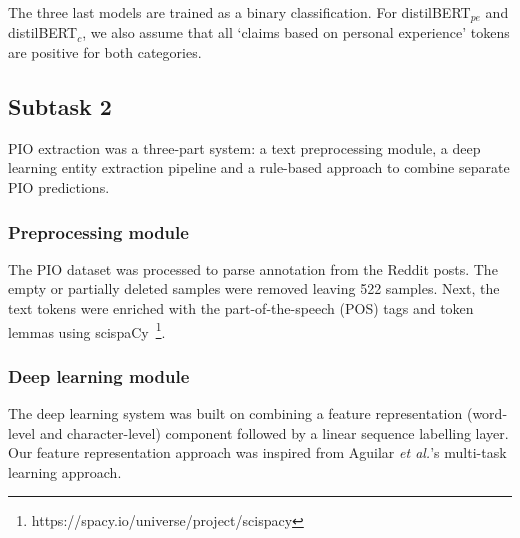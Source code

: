 \documentclass[11pt]{article}
\begin{document}
The three last models are trained as a binary classification. 
For distilBERT$_{pe}$ and distilBERT$_c$, we also assume that all `claims based on personal experience’ tokens are positive for both categories.


%
%
%
\subsection{Subtask 2}
\label{system:task2}
%
PIO extraction was a three-part system: a text preprocessing module, a deep learning entity extraction pipeline and a rule-based approach to combine separate PIO predictions.
%
%
%
\subsubsection{Preprocessing module}
%
The PIO dataset was processed to parse annotation from the Reddit posts.
The empty or partially deleted samples were removed leaving 522 samples.
Next, the text tokens were enriched with the part-of-the-speech (POS) tags and token lemmas using scispaCy~\footnote{https://spacy.io/universe/project/scispacy}.
%
%
%
\subsubsection{Deep learning module}
%
The deep learning system was built on combining a feature representation (word-level and character-level) component followed by a linear sequence labelling layer.
Our feature representation approach was inspired from Aguilar \textit{et al.}'s multi-task learning approach.~\cite{aguilar2019multi}
%
%
%
\end{document}
